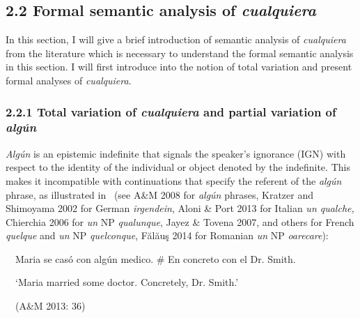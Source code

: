 \subsection[2.2 Formal semantic analysis of cualquiera]{\textbf{2.2 Formal semantic analysis of }\textbf{\textit{cualquiera}}}
\begin{styleStandard}
In this section, I will give a brief introduction of semantic analysis of \textit{cualquiera} from the literature which is necessary to understand the formal semantic analysis in this section. I will first introduce into the notion of total variation and present formal analyses of \textit{cualquiera}. 
\end{styleStandard}

\subsubsection[2.2.1 Total variation of cualquiera and partial variation of algún ]{\textbf{2.2.1 Total variation of }\textbf{\textit{cualquiera}}\textbf{ and partial variation of }\textbf{\textit{algún}}\textbf{ }}
\begin{styleStandard}
\textit{Algún} is an epistemic indefinite that signals the speaker’s ignorance (IGN) with respect to the identity of the individual or object denoted by the indefinite. This makes it incompatible with continuations that specify the referent of the \textit{algún} phrase, as illustrated in \ (see A\&M 2008 for \textit{algún} phrases, Kratzer and Shimoyama 2002 for German \textit{irgendein}, Aloni \& Port 2013 for Italian \textit{un qualche, }Chierchia 2006 for \textit{un }NP\textit{ qualunque}, Jayez \& Tovena 2007, and others for French \textit{quelque} and \textit{un }NP\textit{ quelconque},\textit{ }Fălăuş 2014 for Romanian \textit{un }NP\textit{ oarecare}):
\end{styleStandard}

\begin{styleStandard}
\label{bkm:Ref533761877}\ \ Maria se casó con algún medico. \# En concreto con el Dr. Smith.
\end{styleStandard}

\begin{styleStandard}
\ \ ‘Maria married some doctor. Concretely, Dr. Smith.’
\end{styleStandard}

\begin{stylelsSourceline}
\textup{\ \ (A\&M 2013: 36) }
\end{stylelsSourceline}

